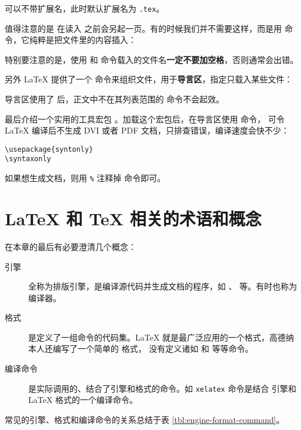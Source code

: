  可以不带扩展名，此时默认扩展名为 \texttt{.tex}。

值得注意的是  在读入  之前会另起一页。有的时候我们并不需要这样，而是用
 命令，它纯粹是把文件里的内容插入：
\begin{command}
\end{command}

特别要注意的是，使用  和  命令载入的文件名\textbf{一定不要加空格}，否则通常会出错。

另外 \LaTeX{} 提供了一个  命令来组织文件，用于\textbf{导言区}，指定只载入某些文件：
\begin{command}
\end{command}

导言区使用了  后，正文中不在其列表范围的  命令不会起效。

最后介绍一个实用的工具宏包 。加载这个宏包后，在导言区使用  命令，
可令 \LaTeX{} 编译后不生成 DVI 或者 PDF 文档，只排查错误，编译速度会快不少：
\begin{verbatim}
\usepackage{syntonly}
\syntaxonly
\end{verbatim}

如果想生成文档，则用 \texttt\% 注释掉  命令即可。

\section{\LaTeX{} 和 \TeX{} 相关的术语和概念}\label{sec:concepts}

在本章的最后有必要澄清几个概念：
\begin{description}
  \item[引擎] 全称为排版引擎，是编译源代码并生成文档的程序，如 、 等。有时也称为编译器。
  \item[格式] 是定义了一组命令的代码集。\LaTeX{} 就是最广泛应用的一个格式，高德纳本人还编写了一个简单的  格式，
  没有定义诸如  和  等等命令。
  \item[编译命令] 是实际调用的、结合了引擎和格式的命令。如 \texttt{xelatex} 命令是结合 
  引擎和 \LaTeX{} 格式的一个编译命令。
\end{description}
常见的引擎、格式和编译命令的关系总结于表 \ref{tbl:engine-format-command}。

